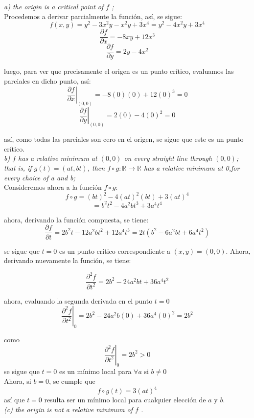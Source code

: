 \documentclass[a4paper,12pt]{article}
\begin{document}
	\textit{a) the origin is a critical point of $f$ ;}\\

	Procedemos a derivar parcialmente la función, así, se sigue:
	$$f(x,y) = y^2 -3x^2y -x^2y + 3x^4 = y^2 -4x^2y + 3x^4  $$
	$$\frac{\partial f}{\partial x} = -8xy + 12x^3 $$
	$$\frac{\partial f}{\partial y} = 2y - 4x^2 $$

	luego, para ver que precisamente el origen es un punto crítico,
	evaluamos las parciales en dicho punto, así:
	$$\left. \frac{\partial f}{\partial x} \right|_{(0,0)}
			= -8(0)(0) + 12(0)^3 = 0 $$
	$$\left. \frac{\partial f}{\partial y} \right|_{(0,0)}
			= 2(0) - 4(0)^2 = 0 $$

	así, como todas las parciales son cero en el origen, se sigue que este es
	un punto crítico.\\

	\textit{b) $f$ has a relative minimum at $(0, 0)$ on every straight line
			through $(0, 0)$; that is, if $g(t) = (at, bt)$, then
			$f \circ g : \mathbb{R} \rightarrow \mathbb{R}$ has a relative
			minimum at 0,for every choice of a and b;}\\

		Consideremos ahora a la funcíón $f \circ g$:
		$$ f \circ g = (bt)^2 - 4(at)^2(bt) + 3(at)^4$$
		$$ = b^2t^2 - 4a^2bt^3 + 3a^4t^4$$

		ahora, derivando la función compuesta, se tiene:
		$$\frac{\partial f}{\partial t} = 2b^2t -12a^2bt^2 + 12a^4t^3
										= 2t(b^2 - 6a^2bt + 6a^4t^2)$$

		se sigue que $t = 0$ es un punto crítico correspondiente a $(x,y) = (0,0)$.
		Ahora, derivando nuevamente la función, se tiene:

		$$\frac{\partial^2 f}{\partial t^2} = 2b^2 -24a^2bt + 36a^4t^2 $$

		ahora, evaluando la segunda derivada en el punto $t = 0$
		$$\left. \frac{\partial^2 f}{\partial t^2} \right|_{0}
			= 2b^2 -24a^2b(0) + 36a^4(0)^2 = 2b^2 $$

		como
			$$\left. \frac{\partial^2 f}{\partial t^2} \right|_{0} = 2b^2 > 0$$
		se sigue que $t = 0$ es un mínimo local para
		$\forall a$ si $b \neq 0$\\

		Ahora, si $b = 0$, se cumple que
			$$f \circ g (t) = 3(at)^4$$
		así que $t = 0$ resulta ser un mínimo local para cualquier elección de
		$a$ y $b$.\\

	\textit{(c) the origin is not a relative minimum of $f$ .}\\
	\newline
	
\end{document}
